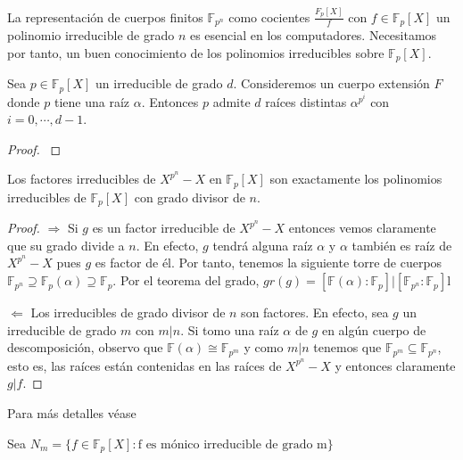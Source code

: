 La representación de cuerpos finitos $\mathbb{F}_{p^n}$ como cocientes $\frac{F_p[X]}{f}$ con $f \in \mathbb{F}_p[X]$ un polinomio irreducible de grado $n$ es esencial en los computadores. Necesitamos por tanto, un buen conocimiento de los polinomios irreducibles sobre $\mathbb{F}_p[X]$.

\begin{proposition}
	Sea $p \in \mathbb{F}_p[X]$ un irreducible de grado $d$. Consideremos un cuerpo extensión $F$ donde $p$ tiene una raíz $\alpha$. Entonces $p$ admite $d$ raíces distintas $\alpha^{p^i}$ con $i = 0,\cdots,d-1$. 
\end{proposition}
\begin{proof}
	\cite{link3}
\end{proof}

\begin{proposition}
	Los factores irreducibles de $X^{p^n} - X$ en $\mathbb{F}_p[X]$ son exactamente los polinomios irreducibles de $\mathbb{F}_p[X]$ con grado divisor de $n$. 
\end{proposition} 
\begin{proof}
	$\Rightarrow$ Si $g$ es un factor irreducible de $X^{p^n} - X$ entonces vemos claramente que su grado divide a $n$. En efecto, $g$ tendrá alguna raíz $\alpha$ y $\alpha$ también es raíz de $X^{p^n} - X$ pues $g$ es factor de él. Por tanto, tenemos la siguiente torre de cuerpos $\mathbb{F}_{p^n} \supseteq \mathbb{F}_{p}(\alpha) \supseteq \mathbb{F}_p$. Por el teorema del grado, $gr(g) = [\mathbb{F}(\alpha):\mathbb{F}_p] | [\mathbb{F}_{p^n}:\mathbb{F}_p]$l
	
	$\Leftarrow$ Los irreducibles de grado divisor de $n$ son factores. En efecto, sea $g$ un irreducible de grado $m$ con $m|n$. Si tomo una raíz $\alpha$ de $g$ en algún cuerpo de descomposición, observo que $\mathbb{F}(\alpha) \cong \mathbb{F}_{p^m}$ y como $m|n$ tenemos que $\mathbb{F}_{p^m} \subseteq \mathbb{F}_{p^n}$, esto es, las raíces están contenidas en las raíces de $X^{p^n} - X$ y entonces claramente $g|f$. 
\end{proof}

Para más detalles véase \cite{link3}

Sea $N_m = \{f \in \mathbb{F}_p[X]:\text{f es mónico irreducible de grado m}\}$

